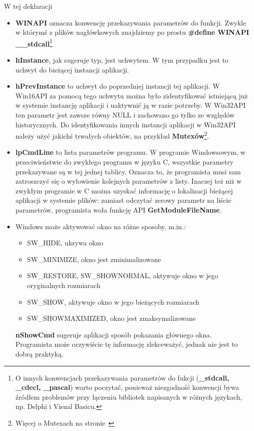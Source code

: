 W tej deklaracji
\begin{itemize}
	
	\item {\bf WINAPI} oznacza konwencję przekazywania parametrów do funkcji. 
	Zwykle w którymś z plików nagłówkowych znajdziemy po prostu 
	{\bf \#define WINAPI \_\_stdcall}\footnote{O innych konwencjach przekazywania parametrów do fukcji
	({\bf \_stdcall, \_cdecl, \_pascal}) warto poczytać, ponieważ niezgodność konwencji bywa źródłem
	problemów przy łączeniu bibliotek napisanych w różnych językach, np. Delphi i Visual Basicu.}
	\item {\bf hInstance}, jak sugeruje typ, jest uchwytem. W tym przypadku jest to uchwyt
	do bieżącej instancji aplikacji.

	\item {\bf hPrevInstance} to uchwyt do poprzedniej instancji tej aplikacji. W Win16API 
	za pomocą tego uchwytu można było zidentyfikować istniejącą już w systemie instancję aplikacji
	i uaktywnić ją w razie potrzeby. W Win32API ten parametr jest zawsze równy NULL i zachowano go
	tylko ze względów historycznych. Do identyfikowania innych instancji aplikacji w Win32API należy
	użyć jakichś trwałych obiektów, na przykład {\bf Mutexów}\footnote{Więcej o Mutexach 
	na stronie~\pageref{subsection_mutexy}}.

	\item {\bf lpCmdLine} to lista parametrów programu. W programie Windowsowym, w przeciwieństwie
	do zwykłego programu w języku C, wszystkie parametry przekazywane są w tej jednej tablicy. 
	Oznacza to, że programista musi sam zatroszczyć się o wyłowienie kolejnych parametrów z listy.
	Inaczej też niż w zwykłym programie w C można uzyskać informację o lokalizacji bieżącej
	aplikacji w systemie plików: zamiast odczytać zerowy parametr na liście parametrów,
	programista woła funkcję API {\bf GetModuleFileName}.

	\item Windows może aktywować okno na różne sposoby, m.in.:

	\begin{itemize}
		\item SW\_HIDE, ukrywa okno
		\item SW\_MINIMIZE, okno jest zminimalizowane
		\item SW\_RESTORE, SW\_SHOWNORMAL, aktywuje okno w jego oryginalnych rozmiarach
		\item SW\_SHOW, aktywuje okno w jego bieżących rozmiarach
		\item SW\_SHOWMAXIMIZED, okno jest zmaksymalizowane
	\end{itemize}
	{\bf nShowCmd} sugeruje aplikacji sposób pokazania głównego okna. Programista
	może oczywiście tę informację zlekceważyć, jednak nie jest to dobrą praktyką.

\end{itemize}

